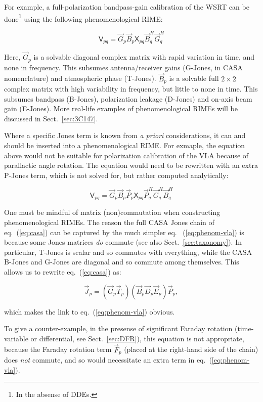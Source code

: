 \documentclass[]{aa}
\newcommand{\herm}{H}
\newcommand{\jones}[2]{\vec {#1}_{#2}}
\newcommand{\jonesT}[2]{\vec {#1}^{\herm}_{#2}}
\newcommand{\coh}[2]{\mathsf{{#1}}_{{#2}}}
\begin{document}
For example, a full-polarization bandpass-gain calibration of the WSRT can be done\footnote{In the absense of DDEs.} using the following phenomenological RIME:

\[
\coh{V}{pq} = \jones{G}{p} \jones{B}{p} \coh{X}{pq} \jonesT{B}{q} \jonesT{G}{q} 
\]

Here, $\jones{G}{p}$ is a solvable diagonal complex matrix with rapid variation in time, and none in frequency. This subsumes antenna/receiver gains (G-Jones, in CASA nomenclature) and atmospheric phase (T-Jones). $\jones{B}{p}$ is a solvable full $2\times2$ complex matrix with high variability in frequency, but little to none in time. This subsumes bandpass (B-Jones), polarization leakage (D-Jones) and on-axis beam gain (E-Jones). More real-life examples of phenomenological RIMEs will be discussed in Sect.~\ref{sec:3C147}.

Where a specific Jones term is known from \emph{a priori} considerations, it can and should be inserted into a phenomenological RIME. For exmaple, the equation above would not be suitable for polarization calibration of the VLA because of parallactic angle rotation. The equation would need to be rewritten with an extra P-Jones term, which is not solved for, but rather computed analytically:

\begin{equation}\label{eq:phenom-vla}
\coh{V}{pq} = \jones{G}{p} \jones{B}{p} \jones{P}{p} \coh{X}{pq} \jonesT{P}{q} \jonesT{G}{q} \jonesT{B}{q} 
\end{equation}

One must be mindful of matrix (non)commutation when constructing phenomenological RIMEs. The reason the full CASA Jones chain of eq.~(\ref{eq:casa}) can be captured by the much simpler eq. ~(\ref{eq:phenom-vla}) is because some Jones matrices \emph{do} commute (see also Sect.~\ref{sec:taxonomy}). In particular, T-Jones is scalar and so commutes with everything, while the CASA B-Jones and G-Jones are diagonal and so commute among themselves. This allows us to rewrite eq.~(\ref{eq:casa}) as:

\[
\jones{J}{p} = (\jones{G}{p}\jones{T}{p})(\jones{B}{p}\jones{D}{p}\jones{E}{p})\jones{P}{p},
\]

which makes the link to eq.~(\ref{eq:phenom-vla}) obvious. 

To give a counter-example, in the presense of significant Faraday rotation (time-variable or differential, see Sect.~\ref{sec:DFR}), this equation is not appropriate, because the Faraday rotation term $\jones{F}{p}$ (placed at the right-hand side of the chain) does \emph{not} commute, and so would necessitate an extra term in eq.~(\ref{eq:phenom-vla}). 
\end{document}
